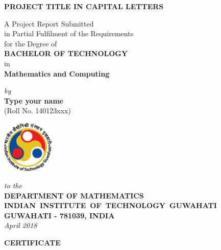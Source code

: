 \documentclass[12pt,a4wide]{report}
\theoremstyle{plain}
\theoremstyle{definition}
\theoremstyle{remark}
\begin{document}


\begin{titlepage}
\enlargethispage{3cm}

\begin{center}

\vspace*{-2cm}

\textbf{\Large PROJECT TITLE IN CAPITAL LETTERS}

\vfill

 A Project Report Submitted \\
 in Partial Fulfilment of the Requirements  \\
  for the Degree of  \\[10pt]

 {\Large \bf BACHELOR OF TECHNOLOGY}\\[5pt]
 in \\
 {\large \bf Mathematics and Computing}

 \vfill

{\large \emph{by}}\\[5pt]
{\large\bf {Type your name}}\\[5pt]
{\large (Roll No. 140123xxx)}

\vfill
\includegraphics[height=2.5cm]{iitglogo.eps}

\vspace*{0.5cm}

{\em\large to the}\\[10pt]
{\bf\large DEPARTMENT OF MATHEMATICS} \\[5pt]
{\bf\large \mbox{INDIAN INSTITUTE OF TECHNOLOGY GUWAHATI}}\\[5pt]
{\bf\large GUWAHATI - 781039, INDIA}\\[10pt]
{\it\large April 2018}
\end{center}

\end{titlepage}

\clearpage

 \setcounter{page}{2}
\begin{center}
{\Large{\bf{CERTIFICATE}}}
\end{center}
\end{document}
